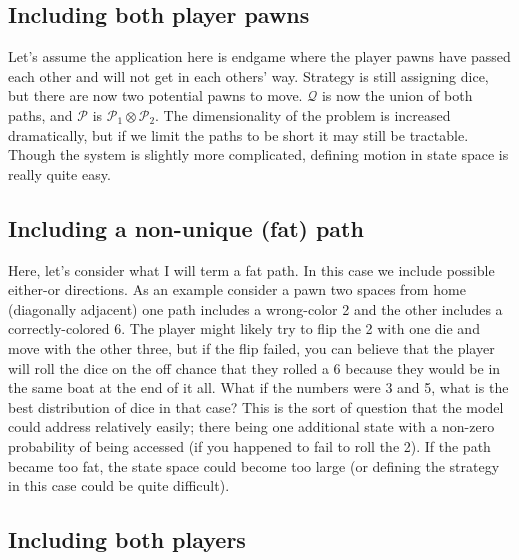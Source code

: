 \documentclass[letterpaper]{article}
\begin{document}
\subsection{Including both player pawns}
Let's assume the application here is endgame where the player pawns have
passed each other and will not get in each others' way.  Strategy is still
assigning dice, but there are now two potential pawns to move.  $\mathcal{Q}$ 
is now the union of both paths, and $\mathcal{P}$ is $\mathcal{P}_1\otimes
\mathcal{P}_2$.  The dimensionality of the problem is increased dramatically,
but if we limit the paths to be short it may still be tractable.  Though the
system is slightly more complicated, defining motion in state space is really
quite easy.

\subsection{Including a non-unique (fat) path}
Here, let's consider what I will term a fat path.  In this case we include
possible either-or directions.  As an example consider a pawn two spaces from
home (diagonally adjacent) one path includes a wrong-color 2 and the other
includes a correctly-colored 6.  The player might likely try to flip the 2 with
one die and move with the other three, but if the flip failed, you can believe
that the player will roll the dice on the off chance that they rolled a 6
because they would be in the same boat at the end of it all.  What if the
numbers were 3 and 5, what is the best distribution of dice in that case?
This is the sort of question that the model could address relatively easily;
there being one additional state with a non-zero probability of being accessed
(if you happened to fail to roll the 2).  If the path became too fat, the state
space could become too large (or defining the strategy in this case could be
quite difficult).

\subsection{Including both players}
\end{document}

